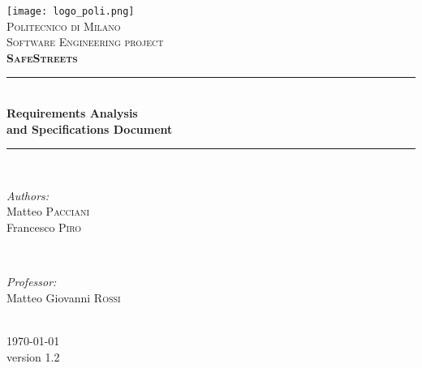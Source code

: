 \begin{titlepage}
	
\newcommand{\HRule}{\rule{\linewidth}{0.5mm}}
\centering

\texttt{[image: logo\_poli.png]}\\[0.5cm]
\textsc{\LARGE Politecnico di Milano}\\[2cm]
\textsc{\Large Software Engineering  project}\\[0.5cm]
\textsc{\LARGE \textbf{SafeStreets}}\\[1.5cm]

\HRule \\[0.4cm]
{ \huge \bfseries Requirements Analysis\\ and Specifications Document}\\[0.4cm] %
\HRule \\[1.5cm]

\begin{minipage}{0.4\textwidth}
	\begin{flushleft} \large
		\emph{Authors:}\\
		Matteo \textsc{Pacciani}\\
		Francesco \textsc{Piro}\\
	\end{flushleft}
\end{minipage}
~
\begin{minipage}{0.4\textwidth}
	\begin{flushright} \large
		\emph{Professor:} \\
		Matteo Giovanni \textsc{Rossi} %
	\end{flushright}
\end{minipage}\\[2cm]

{\large \today}\\[0.5cm] %
{\large version 1.2}\\[2cm]

\vfill
\clearpage

\end{titlepage}